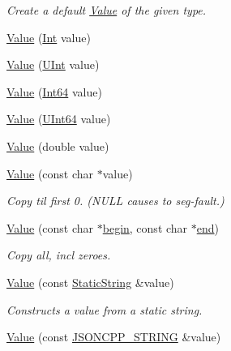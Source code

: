 \begin{DoxyCompactItemize}
\begin{DoxyCompactList}\small\item\em Create a default \hyperlink{class_json_1_1_value}{Value} of the given type. \end{DoxyCompactList}\item 
\hyperlink{class_json_1_1_value_a4744ae571fcf34f4b16a2257b3b3b585}{Value} (\hyperlink{class_json_1_1_value_abdf7a7ff73eb130ffcab28504ffdb405}{Int} value)
\item 
\hyperlink{class_json_1_1_value_ae67a857b01286e3499a87e95be848d20}{Value} (\hyperlink{class_json_1_1_value_a0933d59b45793ae4aade1757c322a98d}{U\+Int} value)
\item 
\hyperlink{class_json_1_1_value_ab1cdc3d9a4d4cc03fa01439d43ceb1b5}{Value} (\hyperlink{class_json_1_1_value_a1b86af9f85f0f1baa972c3319fa22695}{Int64} value)
\item 
\hyperlink{class_json_1_1_value_a8adda58d5ae17bf7ca6a53bab4a7b69c}{Value} (\hyperlink{class_json_1_1_value_a8b62564be8c087c6d18de180ff4e13e3}{U\+Int64} value)
\item 
\hyperlink{class_json_1_1_value_a32228cc84d83200cca8441451997996c}{Value} (double value)
\item 
\hyperlink{class_json_1_1_value_ad87b849356816aca75995dd07302e49d}{Value} (const char $\ast$value)
\begin{DoxyCompactList}\small\item\em Copy til first 0. (N\+U\+LL causes to seg-\/fault.) \end{DoxyCompactList}\item 
\hyperlink{class_json_1_1_value_a39fa09d1902efbd4350e1236db920571}{Value} (const char $\ast$\hyperlink{class_json_1_1_value_a015459a3950c198d63a2d3be8f5ae296}{begin}, const char $\ast$\hyperlink{class_json_1_1_value_a3e443cd0ef24f7e028b175e47ee045e0}{end})
\begin{DoxyCompactList}\small\item\em Copy all, incl zeroes. \end{DoxyCompactList}\item 
\hyperlink{class_json_1_1_value_a081830e95f88a37054da7e46c65b0766}{Value} (const \hyperlink{class_json_1_1_static_string}{Static\+String} \&value)
\begin{DoxyCompactList}\small\item\em Constructs a value from a static string. \end{DoxyCompactList}\item 
\hyperlink{class_json_1_1_value_a89ef37969ff7c6eb3a7afcca03d4cd4a}{Value} (const \hyperlink{config_8h_a1e723f95759de062585bc4a8fd3fa4be}{J\+S\+O\+N\+C\+P\+P\+\_\+\+S\+T\+R\+I\+NG} \&value)

\end{DoxyCompactItemize}
